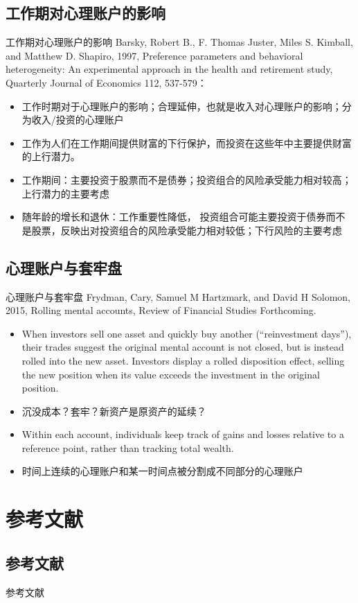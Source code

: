 \documentclass[presentation]{beamer}
\begin{document}
\subsection{工作期对心理账户的影响}
\begin{frame}{工作期对心理账户的影响}
	Barsky, Robert B., F. Thomas Juster, Miles S. Kimball, and Matthew D. Shapiro, 1997, Preference parameters and behavioral heterogeneity: An experimental approach in the health and retirement study, Quarterly Journal of Economics 112, 537-579：
	\begin{itemize}
		\item 工作时期对于心理账户的影响；合理延伸，也就是收入对心理账户的影响；分为收入/投资的心理账户
		\item 工作为人们在工作期间提供财富的下行保护，而投资在这些年中主要提供财富的上行潜力。
		\item 工作期间：主要投资于股票而不是债券；投资组合的风险承受能力相对较高；上行潜力的主要考虑
		\item 随年龄的增长和退休：工作重要性降低， 投资组合可能主要投资于债券而不是股票，反映出对投资组合的风险承受能力相对较低；下行风险的主要考虑
	\end{itemize}
\end{frame}



\subsection{心理账户与套牢盘}
\label{sec:orgae1548a}
\begin{frame}{心理账户与套牢盘}
	Frydman, Cary, Samuel M Hartzmark, and David H Solomon, 2015, Rolling mental accounts, Review of Financial Studies Forthcoming.
	\begin{itemize}
		\item When investors sell one asset and quickly buy another (“reinvestment days”), their trades suggest the original mental account is not closed, but is instead rolled into the new asset. Investors display a rolled disposition effect, selling the new position when its value exceeds the investment in the original position.
		\item 沉没成本？套牢？新资产是原资产的延续？
		\item Within each account, individuals keep track of gains and losses relative to a reference point, rather than tracking total wealth.
		\item 时间上连续的心理账户和某一时间点被分割成不同部分的心理账户
	\end{itemize}
\end{frame}
\section{参考文献}
\subsection{参考文献}
\begin{frame}[allowframebreaks]{参考文献}
	\nocite{*}
	
	
\end{frame}
\end{document}
